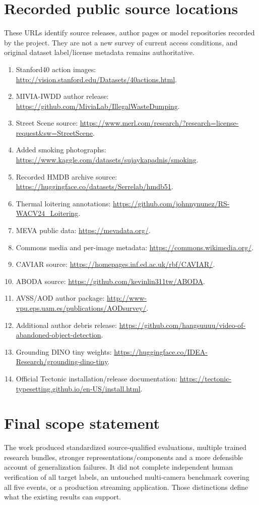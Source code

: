 \section{Recorded public source locations}
These URLs identify source releases, author pages or model repositories recorded by the project. They are not a new survey of current access conditions, and original dataset label/license metadata remains authoritative.
\begin{enumerate}
\item Stanford40 action images: \url{http://vision.stanford.edu/Datasets/40actions.html}.
\item MIVIA-IWDD author release: \url{https://github.com/MiviaLab/IllegalWasteDumping}.
\item Street Scene source: \url{https://www.merl.com/research/?research=license-request&sw=StreetScene}.
\item Added smoking photographs: \url{https://www.kaggle.com/datasets/sujaykapadnis/smoking}.
\item Recorded HMDB archive source: \url{https://huggingface.co/datasets/Serrelab/hmdb51}.
\item Thermal loitering annotations: \url{https://github.com/johnnynunez/RS-WACV24_Loitering}.
\item MEVA public data: \url{https://mevadata.org/}.
\item Commons media and per-image metadata: \url{https://commons.wikimedia.org/}.
\item CAVIAR source: \url{https://homepages.inf.ed.ac.uk/rbf/CAVIAR/}.
\item ABODA source: \url{https://github.com/kevinlin311tw/ABODA}.
\item AVSS/AOD author package: \url{http://www-vpu.eps.uam.es/publications/AODsurvey/}.
\item Additional author debris release: \url{https://github.com/hangsuuuu/video-of-abandoned-object-detection}.
\item Grounding DINO tiny weights: \url{https://huggingface.co/IDEA-Research/grounding-dino-tiny}.
\item Official Tectonic installation/release documentation: \url{https://tectonic-typesetting.github.io/en-US/install.html}.
\end{enumerate}

\section{Final scope statement}
The work produced standardized source-qualified evaluations, multiple trained research bundles, stronger representations/components and a more defensible account of generalization failures. It did not complete independent human verification of all target labels, an untouched multi-camera benchmark covering all five events, or a production streaming application. Those distinctions define what the existing results can support.
